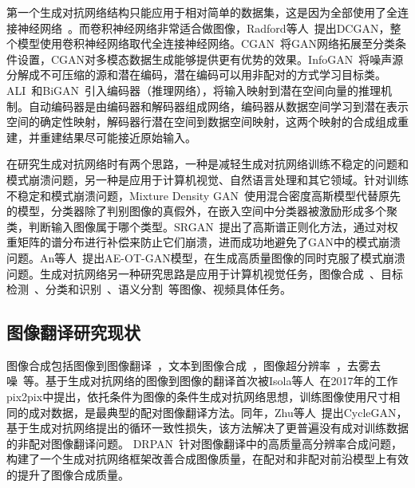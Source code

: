 第一个生成对抗网络结构只能应用于相对简单的数据集，这是因为全部使用了全连接神经网络~\cite{goodfellow2014generative}。而卷积神经网络非常适合做图像，Radford等人~\cite{radford2015unsupervised}提出DCGAN，整个模型使用卷积神经网络取代全连接神经网络。CGAN~\cite{mirza2014conditional}将GAN网络拓展至分类条件设置，CGAN对多模态数据生成能够提供更有优势的效果。InfoGAN~\cite{chen2016infogan}将噪声源分解成不可压缩的源和潜在编码，潜在编码可以用非配对的方式学习目标类。ALI~\cite{donahue2016adversarial}和BiGAN~\cite{zhang2018bidirectional}引入编码器（推理网络），将输入映射到潜在空间向量的推理机制。自动编码器是由编码器和解码器组成网络，编码器从数据空间学习到潜在表示空间的确定性映射，解码器行潜在空间到数据空间映射，这两个映射的合成组成重建，并重建结果尽可能接近原始输入。

在研究生成对抗网络时有两个思路，一种是减轻生成对抗网络训练不稳定的问题和模式崩溃问题，另一种是应用于计算机视觉、自然语言处理和其它领域。针对训练不稳定和模式崩溃问题，Mixture Density GAN~\cite{eghbal2019mixture}使用混合密度高斯模型代替原先的模型，分类器除了判别图像的真假外，在嵌入空间中分类器被激励形成多个聚类，判断输入图像属于哪个类型。SRGAN~\cite{liu2019spectral}提出了高斯谱正则化方法，通过对权重矩阵的谱分布进行补偿来防止它们崩溃，进而成功地避免了GAN中的模式崩溃问题。An等人~\cite{an2020ae}提出AE-OT-GAN模型，在生成高质量图像的同时克服了模式崩溃问题。生成对抗网络另一种研究思路是应用于计算机视觉任务，图像合成~\cite{wang2019discriminative}、目标检测~\cite{wang2017fast}、分类和识别~\cite{oza2020multiple,fang2020generate,jung2020icaps}、语义分割~\cite{luc2016semantic}等图像、视频具体任务。

\subsection{图像翻译研究现状}

图像合成包括图像到图像翻译~\cite{isola2017image}，文本到图像合成~\cite{zhu2019dm}，图像超分辨率~\cite{hyun2020varsr,lee2020journey}，去雾去噪~\cite{shao2020domain,wan2020reflection}等。基于生成对抗网络的图像到图像的翻译首次被Isola等人~\cite{isola2017image}在2017年的工作pix2pix中提出，依托条件为图像的条件生成对抗网络思想，训练图像使用尺寸相同的成对数据，是最典型的配对图像翻译方法。同年，Zhu等人~\cite{zhu2017unpaired}提出CycleGAN，基于生成对抗网络提出的循环一致性损失，该方法解决了更普遍没有成对训练数据的非配对图像翻译问题。
DRPAN~\cite{wang2019discriminative}针对图像翻译中的高质量高分辨率合成问题，构建了一个生成对抗网络框架改善合成图像质量，在配对和非配对前沿模型上有效的提升了图像合成质量。

